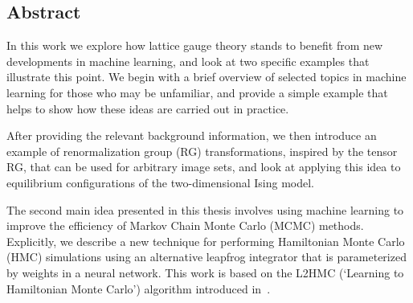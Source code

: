 \begin{doublespace}
%

\chapter*{Abstract}
In this work we explore how lattice gauge theory stands to benefit from new
developments in machine learning, and look at two specific examples that
illustrate this point.
%
We begin with a brief overview of selected topics in machine learning for those
who may be unfamiliar, and provide a simple example that helps to show how
these ideas are carried out in practice.

After providing the relevant background information, we then introduce an
example of renormalization group (RG) transformations, inspired by the tensor
RG, that can be used for arbitrary image sets, and look at applying this idea
to equilibrium configurations of the two-dimensional Ising model.

The second main idea presented in this thesis involves using machine learning
to improve the efficiency of Markov Chain Monte Carlo (MCMC) methods.
%
Explicitly, we describe a new technique for performing Hamiltonian Monte Carlo
(HMC) simulations using an alternative leapfrog integrator that is
parameterized by weights in a neural network.
%
This work is based on the L2HMC (`Learning to Hamiltonian Monte Carlo')
algorithm introduced in~\cite{2017arXiv171109268L}.


%


\end{doublespace}
